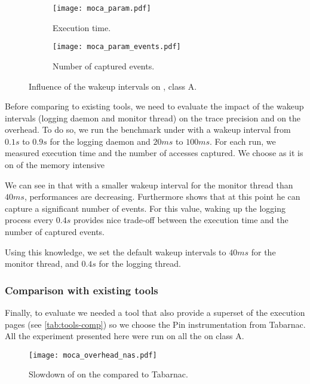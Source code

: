 \begin{figure}[htb]
    \centering
    \begin{subfigure}{\linewidth}
        \texttt{[image: moca\_param.pdf]}
        \caption{Execution time.}
        \label{fig:param_time}
    \end{subfigure}

    \begin{subfigure}{\linewidth}
        \texttt{[image: moca\_param\_events.pdf]}
        \caption{Number of captured events.}
        \label{fig:param_evts}
    \end{subfigure}
    \caption{Influence of the wakeup intervals on \IS, class A.}
    \label{fig:param}
\end{figure}

Before comparing \Moca to existing tools, we need to evaluate the impact of
the wakeup intervals (logging daemon and monitor thread) on the trace
precision and on the overhead. To do so, we run the \IS benchmark under \Moca with
a wakeup interval from $0.1s$ to  $0.9s$ for the logging daemon and $20ms$ to
$100ms$. For each run, we measured \IS execution time and the number of
accesses captured. We choose \IS as it is on of the memory intensive \NPB

We can see in  that with a smaller wakeup interval for the
monitor thread than
$40ms$, performances are decreasing. Furthermore  shows
that at this point he can capture a significant number of events. For this
value, waking up the logging process every $0.4s$ provides nice trade-off
between the execution time and the number of captured events.

Using this knowledge, we set the default wakeup intervals to $40ms$ for the
monitor thread, and $0.4s$ for the logging thread.

\subsubsection{Comparison with existing tools}

Finally, to evaluate \Moca we needed a tool that also provide a superset of
the execution pages (see \ref{tab:tools-comp}) so we choose the Pin
instrumentation from Tabarnac. All the experiment presented here were run on
all the \NPB on class A.

\begin{figure}[htb]
    \centering
    \texttt{[image: moca\_overhead\_nas.pdf]}
    \caption{Slowdown of \Moca on the \NPB compared to
    Tabarnac.}
    \label{fig:ovh}
\end{figure}

